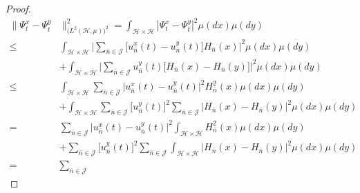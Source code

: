 \documentclass[review, onefignum, onetabnum]{siamart171218}
\begin{document}
\begin{proof}
\begin{equation}
\label{s3.8.1}
    \begin{aligned}
        \| \Psi_t ^ x - \Psi_t ^ y & \|_{
            \big(
                L^2(\mathcal{H},\mu)
            \big)^2
        }^2
            =
                \int_{\mathcal{H}\times \mathcal{H}}
                |\Psi_t^x - \Psi_t^y|^2 \mu(dx) \mu(dy)
            \\
            \le&
            \int_{\mathcal{H} \times \mathcal{H}}
                \Big|
                    \sum_{\bar n\in \mathcal{J}}
                    \big[
                        u_{\bar n} ^ x(t) - u_{\bar n} ^ y(t)
                    \big]
                    H_{\bar n}(x)
                \Big|^2
                \mu(dx) \mu(dy)
            \\
            &+
            \int_{\mathcal{H}\times \mathcal{H}}
            \Big|
                \sum_{\bar n\in \mathcal{J}}
                    u_{\bar n}^y(t)
                    \big[
                        H_{\bar n}(x) - H_{\bar n}(y)
                    \big]
            \Big|^2
            \mu(dx) \mu(dy)
            \\
            \le&
            \int_{\mathcal{H} \times \mathcal{H}}
            \sum_{\bar n\in \mathcal{J}}
            \big|
                u_{\bar n}^x(t) - u_{\bar n}^y(t)
            \big |^2
            H_{\bar n}^2(x)
            \mu(dx) \mu(dy)
            \\
            &+
            \int_{\mathcal{H}\times \mathcal{H}}
            \sum_{\bar n\in \mathcal{J}}
            \big[u_{\bar n} ^ y(t) \big]^2
            \sum_{\bar n\in \mathcal{J}}
            \big|
                H_{\bar n}(x) - H_{\bar n}(y)
            \big|^2
            \mu(dx) \mu(dy)
            \\
            =&
            \sum_{\bar n\in \mathcal{J}}
            \big|
                u_{\bar n}^x(t)-u_{\bar n}^y(t)
            \big |^2
            \int_{\mathcal{H} \times \mathcal{H}}
            H_{\bar n}^2 (x)
            \mu(dx) \mu(dy)
            \\
            &+
            \sum_{\bar n\in \mathcal{J}}
            \big[
                u_{\bar n}^y(t)
            \big] ^ 2
            \sum_{\bar n\in \mathcal{J}}
            \int_{\mathcal{H}\times \mathcal{H}}
            \big|
                H_{\bar n}(x) - H_{\bar n}(y)
            \big| ^ 2 \mu(dx)\mu(dy)
            \\
            =&
            \sum_{\bar n\in \mathcal{J}}

\end{aligned}
\end{equation}
\end{proof}
\end{document}
